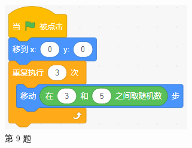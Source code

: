 \documentclass[10pt, a4paper]{article}
\begin{document}
\begin{enumerate}
        \begin{figure}[htbp]
            \centering
            \begin{minipage}[t]{.25\textwidth}
                \centering
                \includegraphics[width=\textwidth]{figure/9.png}
                \caption*{第 9 题}
            \end{minipage}
            \begin{minipage}[t]{.13\textwidth}
                \centering

\end{minipage}
\end{figure}
\end{enumerate}
\end{document}
